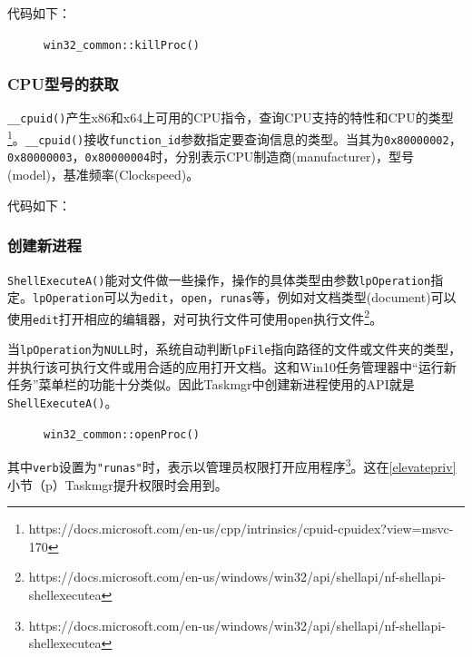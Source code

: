 \documentclass[UTF8,twoside,titlepage]{ctexart}
\newcommand\code[1]{\texttt{#1}}
\begin{document}
代码如下：

\begin{figure}[H]
    \ttfamily
    
    \caption{\code{win32\_common::killProc()}}
\end{figure}

\subsubsection{CPU型号的获取}
\code{\_\_cpuid()}产生x86和x64上可用的CPU指令，查询CPU支持的特性和CPU的类型\footnote{https://docs.microsoft.com/en-us/cpp/intrinsics/cpuid-cpuidex?view=msvc-170}。\code{\_\_cpuid()}接收\code{function\_id}参数指定要查询信息的类型。当其为\code{0x80000002}，\code{0x80000003}，\code{0x80000004}时，分别表示CPU制造商(manufacturer)，型号(model)，基准频率(Clockspeed)。

代码如下：

{
    \ttfamily
    
}

\subsubsection{创建新进程}
\code{ShellExecuteA()}能对文件做一些操作，操作的具体类型由参数\code{lpOperation}指定。\code{lpOperation}可以为\code{edit}，\code{open}，\code{runas}等，例如对文档类型(document)可以使用\code{edit}打开相应的编辑器，对可执行文件可使用\code{open}执行文件\footnote{https://docs.microsoft.com/en-us/windows/win32/api/shellapi/nf-shellapi-shellexecutea}。

当\code{lpOperation}为\code{NULL}时，系统自动判断\code{lpFile}指向路径的文件或文件夹的类型，并执行该可执行文件或用合适的应用打开文档。这和Win10任务管理器中``运行新任务''菜单栏的功能十分类似。因此Taskmgr中创建新进程使用的API就是\code{ShellExecuteA()}。

\begin{figure}[H]
    \centering
    \ttfamily
    
    \caption{\code{win32\_common::openProc()}}
\end{figure}

其中\code{verb}设置为\code{"runas"}时，表示以管理员权限打开应用程序\footnote{https://docs.microsoft.com/en-us/windows/win32/api/shellapi/nf-shellapi-shellexecutea}。这在\ref{elevatepriv} 小节（p\pageref{elevatepriv}）Taskmgr提升权限时会用到。
\end{document}
